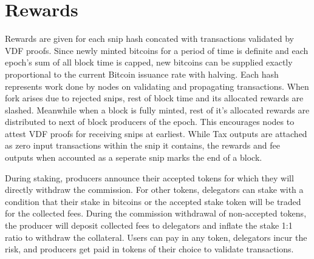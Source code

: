 \documentclass[a4paper,10pt]{article}
\begin{document}
\section{Rewards}

Rewards are given for each snip hash concated with transactions validated by VDF proofs. Since newly minted bitcoins for a period of time is definite and each epoch's sum of all block time is capped, new bitcoins can be supplied exactly proportional to the current Bitcoin issuance rate with halving. Each hash represents work done by nodes on validating and propagating transactions. When fork arises due to rejected snips, rest of block time and its allocated rewards are slashed. Meanwhile when a block is fully minted, rest of it's allocated rewards are distributed to next of block producers of the epoch. This encourages nodes to attest VDF proofs for receiving snips at earliest. While Tax outputs are attached as zero input transactions within the snip it contains, the rewards and fee outputs when accounted as a seperate snip marks the end of a block. 

During staking, producers announce their accepted tokens for which they will directly withdraw the commission. For other tokens, delegators can stake with a condition that their stake in bitcoins or the accepted stake token will be traded for the collected fees. During the commission withdrawal of non-accepted tokens, the producer will deposit collected fees to delegators and inflate the stake 1:1 ratio to withdraw the collateral. Users can pay in any token, delegators incur the risk, and producers get paid in tokens of their choice to validate transactions.
\end{document}
